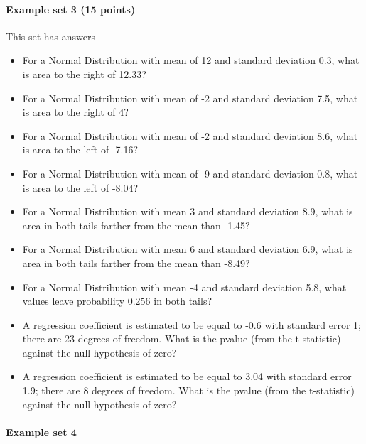 \documentclass[]{article}
\providecommand{\tightlist}{%
  \setlength{\itemsep}{0pt}\setlength{\parskip}{0pt}}
\let\oldparagraph\paragraph
\renewcommand{\paragraph}[1]{\oldparagraph{#1}\mbox{}}
\begin{document}
\paragraph{Example set 3 (15 points)}\label{example-set-3-15-points}

This set has answers

\begin{itemize}
\tightlist
\item
  For a Normal Distribution with mean of 12 and standard deviation 0.3,
  what is area to the right of 12.33?
\item
  For a Normal Distribution with mean of -2 and standard deviation 7.5,
  what is area to the right of 4?
\item
  For a Normal Distribution with mean of -2 and standard deviation 8.6,
  what is area to the left of -7.16?
\item
  For a Normal Distribution with mean of -9 and standard deviation 0.8,
  what is area to the left of -8.04?
\item
  For a Normal Distribution with mean 3 and standard deviation 8.9, what
  is area in both tails farther from the mean than -1.45?
\item
  For a Normal Distribution with mean 6 and standard deviation 6.9, what
  is area in both tails farther from the mean than -8.49?
\item
  For a Normal Distribution with mean -4 and standard deviation 5.8,
  what values leave probability 0.256 in both tails?
\item
  A regression coefficient is estimated to be equal to -0.6 with
  standard error 1; there are 23 degrees of freedom. What is the pvalue
  (from the t-statistic) against the null hypothesis of zero?
\item
  A regression coefficient is estimated to be equal to 3.04 with
  standard error 1.9; there are 8 degrees of freedom. What is the pvalue
  (from the t-statistic) against the null hypothesis of zero?
\end{itemize}

\paragraph{Example set 4}\label{example-set-4}
\end{document}
